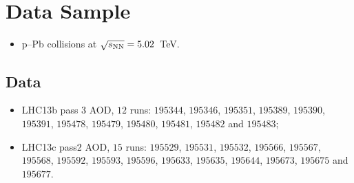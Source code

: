 \section{Data Sample}

\begin{itemize}
\item p--Pb collisions at $\sqrt{s_{\rm NN}}=5.02$~TeV.
\end{itemize}

\subsection{Data}\label{sec:02DataSample}

\begin{itemize} 
\item LHC13b pass 3 AOD, $12$ runs:
      $195344$, $195346$, $195351$, $195389$,
      $195390$, $195391$, $195478$, $195479$,
      $195480$, $195481$, $195482$ and $195483$;
\item LHC13c pass2 AOD, $15$ runs:
      $195529$, $195531$, $195532$, $195566$, $195567$,
      $195568$, $195592$, $195593$, $195596$, $195633$,
      $195635$, $195644$, $195673$, $195675$ and $195677$.
\end{itemize}


